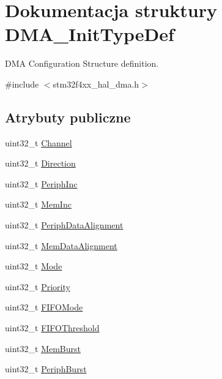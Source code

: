 \hypertarget{struct_d_m_a___init_type_def}{}\section{Dokumentacja struktury D\+M\+A\+\_\+\+Init\+Type\+Def}
\label{struct_d_m_a___init_type_def}


D\+MA Configuration Structure definition.  




{\ttfamily \#include $<$stm32f4xx\+\_\+hal\+\_\+dma.\+h$>$}

\subsection*{Atrybuty publiczne}
\begin{DoxyCompactItemize}
\item 
uint32\+\_\+t \hyperlink{struct_d_m_a___init_type_def_af62608eb25864208cae5d59acef282a6}{Channel}
\item 
uint32\+\_\+t \hyperlink{struct_d_m_a___init_type_def_a0145b5d0e074fa8e2e185ecf2c4a15ca}{Direction}
\item 
uint32\+\_\+t \hyperlink{struct_d_m_a___init_type_def_a46811eb656170cb5c542054d1a41db3a}{Periph\+Inc}
\item 
uint32\+\_\+t \hyperlink{struct_d_m_a___init_type_def_a49b187ba5ab8ba4354e02837e8b99414}{Mem\+Inc}
\item 
uint32\+\_\+t \hyperlink{struct_d_m_a___init_type_def_a10a4a549953efa20c235dcbb381b6f0b}{Periph\+Data\+Alignment}
\item 
uint32\+\_\+t \hyperlink{struct_d_m_a___init_type_def_a7784efedc4a61325fa7364fcace10136}{Mem\+Data\+Alignment}
\item 
uint32\+\_\+t \hyperlink{struct_d_m_a___init_type_def_adbbca090b53d32ac93cc7359b7994db2}{Mode}
\item 
uint32\+\_\+t \hyperlink{struct_d_m_a___init_type_def_af110cc02c840207930e3c0e5de5d7dc4}{Priority}
\item 
uint32\+\_\+t \hyperlink{struct_d_m_a___init_type_def_acda0396cf55baab166f51b1ea1deed0d}{F\+I\+F\+O\+Mode}
\item 
uint32\+\_\+t \hyperlink{struct_d_m_a___init_type_def_a2f994cc2979b82cd215e9f38edbbc6ed}{F\+I\+F\+O\+Threshold}
\item 
uint32\+\_\+t \hyperlink{struct_d_m_a___init_type_def_ad5e266a0b90f58365e21c349654bc68d}{Mem\+Burst}
\item 
uint32\+\_\+t \hyperlink{struct_d_m_a___init_type_def_a3fbfe4dd664e24845dc75f5c8f43b5a3}{Periph\+Burst}
\end{DoxyCompactItemize}


